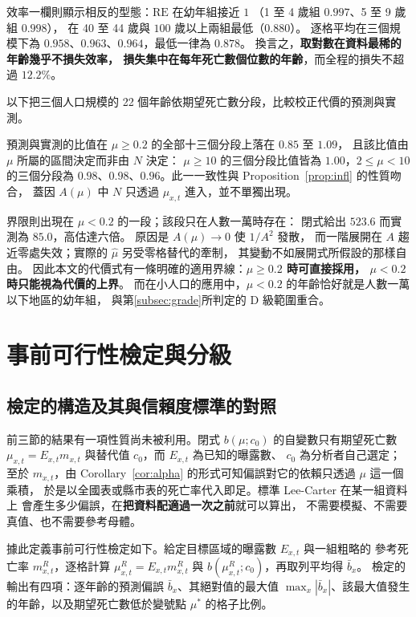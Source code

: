 \documentclass[UTF8, fontset=macnew, a4paper, 12pt]{ctexart}
\begin{document}
效率一欄則顯示相反的型態：$\mathrm{RE}$ 在幼年組接近 $1$
（1 至 4 歲組 $0.997$、5 至 9 歲組 $0.998$），
在 40 至 44 歲與 $100$ 歲以上兩組最低（$0.880$）。
逐格平均在三個規模下為 $0.958$、$0.963$、$0.964$，最低一律為 $0.878$。
換言之，\textbf{取對數在資料最稀的年齡幾乎不損失效率，
損失集中在每年死亡數個位數的年齡}，而全程的損失不超過 $12.2\%$。


以下把三個人口規模的 22 個年齡依期望死亡數分段，比較校正代價的預測與實測。

預測與實測的比值在 $\mu\ge0.2$ 的全部十三個分段上落在 $0.85$ 至 $1.09$，
且該比值由 $\mu$ 所屬的區間決定而非由 $N$ 決定：
$\mu\ge10$ 的三個分段比值皆為 $1.00$，$2\le\mu<10$ 的三個分段為
$0.98$、$0.98$、$0.96$。此一一致性與 Proposition~\ref{prop:infl} 的性質吻合，
蓋因 $A(\mu)$ 中 $N$ 只透過 $\mu_{x,t}$ 進入，並不單獨出現。

界限則出現在 $\mu<0.2$ 的一段；該段只在人數一萬時存在：
閉式給出 $523.6$ 而實測為 $85.0$，高估達六倍。
原因是 $A(\mu)\to0$ 使 $1/A^2$ 發散，
而一階展開在 $A$ 趨近零處失效；實際的 $\hat\mu$ 另受零格替代的牽制，
其變動不如展開式所假設的那樣自由。
因此本文的代價式有一條明確的適用界線：\textbf{$\mu\ge0.2$ 時可直接採用，
$\mu<0.2$ 時只能視為代價的上界}。
而在小人口的應用中，$\mu<0.2$ 的年齡恰好就是人數一萬以下地區的幼年組，
與第\ref{subsec:grade}所判定的 D 級範圍重合。

\section{事前可行性檢定與分級}\label{sec:feas}

\subsection{檢定的構造及其與信賴度標準的對照}\label{subsec:feasconstr}\label{subsec:cred2}

前三節的結果有一項性質尚未被利用。閉式 $b(\mu;c_0)$ 的自變數只有期望死亡數
$\mu_{x,t}=E_{x,t}m_{x,t}$ 與替代值 $c_0$，而 $E_{x,t}$ 為已知的曝露數、
$c_0$ 為分析者自己選定；至於 $m_{x,t}$，由 Corollary~\ref{cor:alpha}
的形式可知偏誤對它的依賴只透過 $\mu$ 這一個乘積，
於是以全國表或縣市表的死亡率代入即足。標準 Lee-Carter 在某一組資料上
會產生多少偏誤，在\textbf{把資料配適過一次之前}就可以算出，
不需要模擬、不需要真值、也不需要參考母體。

據此定義事前可行性檢定如下。給定目標區域的曝露數 $E_{x,t}$ 與一組粗略的
參考死亡率 $m^{R}_{x,t}$，逐格計算 $\mu^{R}_{x,t}=E_{x,t}m^{R}_{x,t}$ 與
$b(\mu^{R}_{x,t};c_0)$，再取列平均得 $\bar b_x$。
檢定的輸出有四項：逐年齡的預測偏誤 $\bar b_x$、其絕對值的最大值
$\max_x|\bar b_x|$、該最大值發生的年齡，以及期望死亡數低於變號點
$\mu^{\ast}$ 的格子比例。
\end{document}
